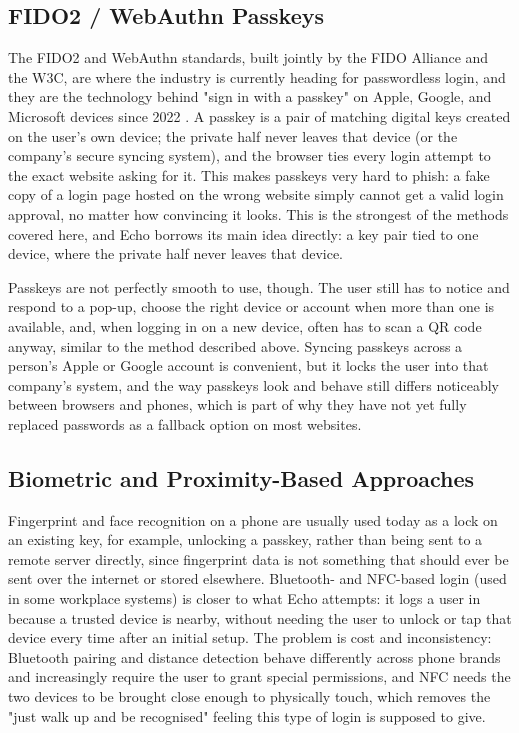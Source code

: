 \subsection{FIDO2 / WebAuthn Passkeys}

The FIDO2 and WebAuthn standards, built jointly by the FIDO Alliance and
the W3C, are where the industry is currently heading for passwordless
login, and they are the technology behind "sign in with a passkey" on
Apple, Google, and Microsoft devices since 2022
\cite{fidoalliance, w3cwebauthn}. A passkey is a pair of matching digital
keys created on the user's own device; the private half never leaves that
device (or the company's secure syncing system), and the browser ties
every login attempt to the exact website asking for it. This makes
passkeys very hard to phish: a fake copy of a login page hosted on the
wrong website simply cannot get a valid login approval, no matter how
convincing it looks. This is the strongest of the methods covered here,
and Echo borrows its main idea directly: a key pair tied to one device,
where the private half never leaves that device.

Passkeys are not perfectly smooth to use, though. The user still has to
notice and respond to a pop-up, choose the right device or account when
more than one is available, and, when logging in on a new device, often
has to scan a QR code anyway, similar to the method described above.
Syncing passkeys across a person's Apple or Google account is convenient,
but it locks the user into that company's system, and the way passkeys
look and behave still differs noticeably between browsers and phones,
which is part of why they have not yet fully replaced passwords as a
fallback option on most websites.

\subsection{Biometric and Proximity-Based Approaches}

Fingerprint and face recognition on a phone are usually used today as a
lock on an existing key, for example, unlocking a passkey, rather than
being sent to a remote server directly, since fingerprint data is not
something that should ever be sent over the internet or stored elsewhere.
Bluetooth- and NFC-based login (used in some workplace systems) is closer
to what Echo attempts: it logs a user in because a trusted device is
nearby, without needing the user to unlock or tap that device every time
after an initial setup. The problem is cost and inconsistency: Bluetooth
pairing and distance detection behave differently across phone brands and
increasingly require the user to grant special permissions, and NFC needs
the two devices to be brought close enough to physically touch, which
removes the "just walk up and be recognised" feeling this type of login is
supposed to give.

